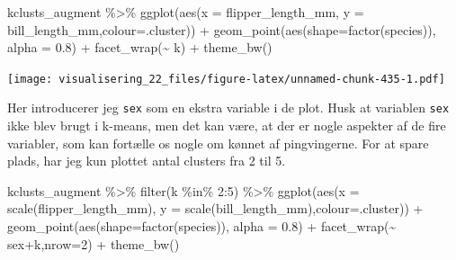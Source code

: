 \documentclass[
]{book}
\newenvironment{Shaded}{\begin{snugshade}}{\end{snugshade}}
\newcommand{\AttributeTok}[1]{\textcolor[rgb]{0.77,0.63,0.00}{#1}}
\newcommand{\DecValTok}[1]{\textcolor[rgb]{0.00,0.00,0.81}{#1}}
\newcommand{\FloatTok}[1]{\textcolor[rgb]{0.00,0.00,0.81}{#1}}
\newcommand{\FunctionTok}[1]{\textcolor[rgb]{0.00,0.00,0.00}{#1}}
\newcommand{\NormalTok}[1]{#1}
\newcommand{\SpecialCharTok}[1]{\textcolor[rgb]{0.00,0.00,0.00}{#1}}
\begin{document}
\begin{Shaded}
\begin{Highlighting}[]
\NormalTok{kclusts\_augment }\SpecialCharTok{\%\textgreater{}\%} 
  \FunctionTok{ggplot}\NormalTok{(}\FunctionTok{aes}\NormalTok{(}\AttributeTok{x =}\NormalTok{ flipper\_length\_mm, }\AttributeTok{y =}\NormalTok{ bill\_length\_mm,}\AttributeTok{colour=}\NormalTok{.cluster)) }\SpecialCharTok{+}
        \FunctionTok{geom\_point}\NormalTok{(}\FunctionTok{aes}\NormalTok{(}\AttributeTok{shape=}\FunctionTok{factor}\NormalTok{(species)), }\AttributeTok{alpha =} \FloatTok{0.8}\NormalTok{) }\SpecialCharTok{+} 
        \FunctionTok{facet\_wrap}\NormalTok{(}\SpecialCharTok{\textasciitilde{}}\NormalTok{ k) }\SpecialCharTok{+} \FunctionTok{theme\_bw}\NormalTok{()}
\end{Highlighting}
\end{Shaded}

\texttt{[image: visualisering\_22\_files/figure-latex/unnamed-chunk-435-1.pdf]}

Her introducerer jeg \texttt{sex} som en ekstra variable i de plot. Husk at variablen \texttt{sex} ikke blev brugt i k-means, men det kan være, at der er nogle aspekter af de fire variabler, som kan fortælle os nogle om kønnet af pingvingerne. For at spare plads, har jeg kun plottet antal clusters fra 2 til 5.

\begin{Shaded}
\begin{Highlighting}[]
\NormalTok{kclusts\_augment }\SpecialCharTok{\%\textgreater{}\%} \FunctionTok{filter}\NormalTok{(k }\SpecialCharTok{\%in\%} \DecValTok{2}\SpecialCharTok{:}\DecValTok{5}\NormalTok{) }\SpecialCharTok{\%\textgreater{}\%} 
  \FunctionTok{ggplot}\NormalTok{(}\FunctionTok{aes}\NormalTok{(}\AttributeTok{x =} \FunctionTok{scale}\NormalTok{(flipper\_length\_mm), }\AttributeTok{y =} \FunctionTok{scale}\NormalTok{(bill\_length\_mm),}\AttributeTok{colour=}\NormalTok{.cluster)) }\SpecialCharTok{+}
        \FunctionTok{geom\_point}\NormalTok{(}\FunctionTok{aes}\NormalTok{(}\AttributeTok{shape=}\FunctionTok{factor}\NormalTok{(species)), }\AttributeTok{alpha =} \FloatTok{0.8}\NormalTok{) }\SpecialCharTok{+} 
        \FunctionTok{facet\_wrap}\NormalTok{(}\SpecialCharTok{\textasciitilde{}}\NormalTok{ sex}\SpecialCharTok{+}\NormalTok{k,}\AttributeTok{nrow=}\DecValTok{2}\NormalTok{) }\SpecialCharTok{+} \FunctionTok{theme\_bw}\NormalTok{()}
\end{Highlighting}
\end{Shaded}
\end{document}
